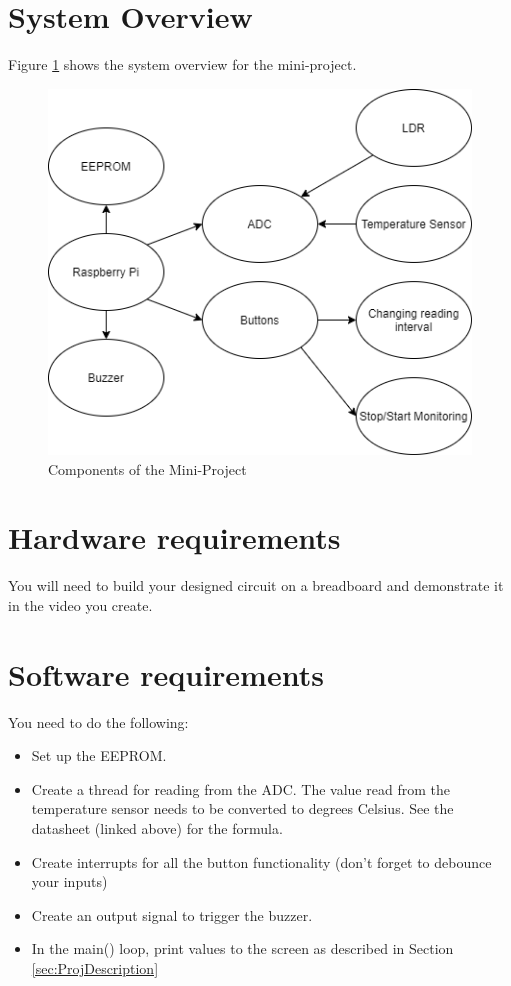 \section{System Overview}
Figure \ref{fig:SystemOverview} shows the system overview for the mini-project.
\begin{figure}[H]
\centering
\includegraphics[width=0.6\columnwidth]{Figures/SystemOverview}
\caption{Components of the Mini-Project}
\label{fig:SystemOverview}
\end{figure}




\section{Hardware requirements}
You will need to build your designed circuit on a breadboard and demonstrate it in the video you create.

\section{Software requirements}
You need to do the following:
\begin{itemize}
    \item Set up the EEPROM. 
    \item Create a thread for reading from the ADC. The value read from the temperature sensor needs to be converted to degrees Celsius. See the datasheet (linked above) for the formula.
    \item Create interrupts for all the button functionality (don't forget to debounce your inputs)
    \item Create an output signal to trigger the buzzer.
    \item In the main() loop, print values to the screen as described in Section \ref{sec:ProjDescription}
\end{itemize}

